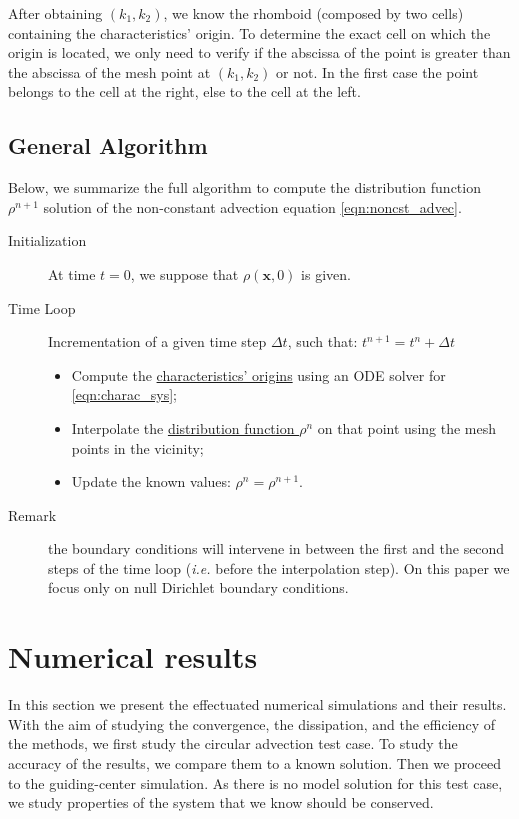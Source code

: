 \documentclass[proc]{edpsmath}
\begin{document}
After obtaining $(k_1, k_2)$, we know the rhomboid (composed by two cells) containing the characteristics' origin. To determine the exact cell on which the origin is located, we only need to verify if the abscissa of the point is greater than the abscissa of the mesh point at $(k_1, k_2)$ or not. In the first case the point belongs to the cell at the right, else to the cell at the left.


\subsection{General Algorithm}

Below, we summarize the full algorithm to compute the distribution function $\rho^{n+1}$ solution of the non-constant advection equation \eqref{eqn:noncst_advec}.

\begin{description}
	\item[Initialization] At time $t=0$, we suppose that $\rho(\mathbf{x}, 0)$ is given.
	\item[Time Loop] Incrementation of a given time step $\Delta t$, such that: $t^{n+1} = t^n + \Delta t$
		\begin{itemize}
		\item Compute the \underline{characteristics' origins} using an ODE solver for \eqref{eqn:charac_sys};
		\item Interpolate the \underline{distribution function $\rho^n$} on that point using the mesh points in the vicinity;
		\item Update the known values: $\rho^n = \rho^{n+1}$.
		\end{itemize}
	\item[Remark] the boundary conditions will intervene in between the first and the second steps of the time loop (\emph{i.e.} before the interpolation step). On this paper we focus only on null Dirichlet boundary conditions.
\end{description}


\section{Numerical results}
\label{sec:results}
In this section we present the effectuated numerical simulations and their results. With the aim of studying the convergence, the dissipation, and the  efficiency of the methods, we first study the circular advection test case. To study the accuracy of the results, we compare them to a known solution. Then we proceed to the guiding-center simulation. As there is no model solution for this test case, we study properties of the system that we know should be conserved.
\end{document}

